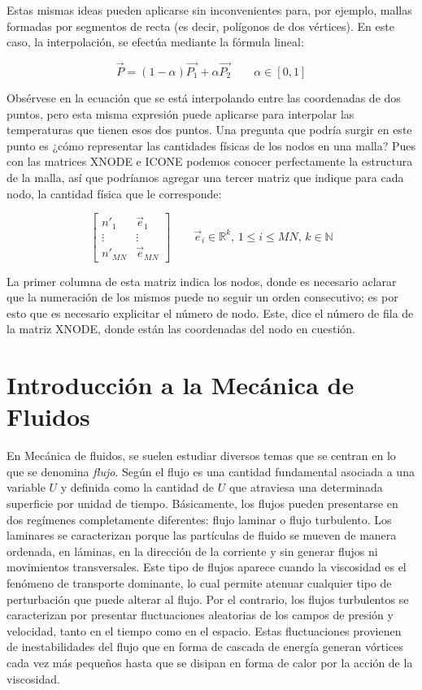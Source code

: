 Estas mismas ideas pueden aplicarse sin inconvenientes para, por ejemplo, mallas formadas por segmentos de recta (es decir, polígonos de dos vértices). En este caso, la interpolación, se efectúa mediante la fórmula lineal:

\begin{equation}
  \label{eq:interpolacionlineal}
  \vec{P} = (1-\alpha)\vec{P_1} + \alpha\vec{P_2} \qquad \alpha\in[0,1]
\end{equation}

Obsérvese en la ecuación que se está interpolando entre las coordenadas de dos puntos, pero esta misma expresión puede aplicarse para interpolar las temperaturas que tienen esos dos puntos.
Una pregunta que podría surgir en este punto es ¿cómo representar las cantidades físicas de los nodos en una malla? Pues con las matrices XNODE e ICONE podemos conocer perfectamente la estructura de la malla, así que podríamos agregar una tercer matriz que indique para cada nodo, la cantidad física que le corresponde:

\begin{equation}
  \label{eq:estados}
  \begin{bmatrix}
    n'_{1} & \vec{e}_{1} \\
    \vdots & \vdots \\
    n'_{MN} & \vec{e}_{MN}
  \end{bmatrix}
  \qquad \vec{e}_i\in\mathbb{R}^k,\,1\leq i\leq MN,\,k\in \mathbb{N}
\end{equation}

La primer columna de esta matriz indica los nodos, donde es necesario aclarar que la numeración de los mismos puede no seguir un orden consecutivo; es por esto que es necesario explicitar el número de nodo. Este, dice el número de fila de la matriz XNODE, donde están las coordenadas del nodo en cuestión.

\section{Introducción a la Mecánica de Fluidos}

	En Mecánica de fluidos, se suelen estudiar diversos temas que se centran en lo que se denomina \emph{flujo}. Según \cite{Hirsch} el flujo es una cantidad fundamental asociada a una variable $U$ y definida como la cantidad de $U$ que atraviesa una determinada superficie por unidad de tiempo. Básicamente, los flujos pueden presentarse en dos regímenes completamente diferentes: flujo laminar o flujo turbulento. Los laminares se caracterizan porque las partículas de fluido se mueven de manera ordenada, en láminas, en la dirección de la corriente y sin generar flujos ni movimientos transversales. Este tipo de flujos aparece cuando la viscosidad es el fenómeno de transporte dominante, lo cual permite atenuar cualquier tipo de perturbación que puede alterar al flujo. Por el contrario, los flujos turbulentos se caracterizan por presentar fluctuaciones aleatorias de los campos de presión y velocidad, tanto en el tiempo como en el espacio. Estas fluctuaciones provienen de inestabilidades del flujo que en forma de cascada de energía generan vórtices cada vez más pequeños hasta que se disipan en forma de calor por la acción de la viscosidad.

